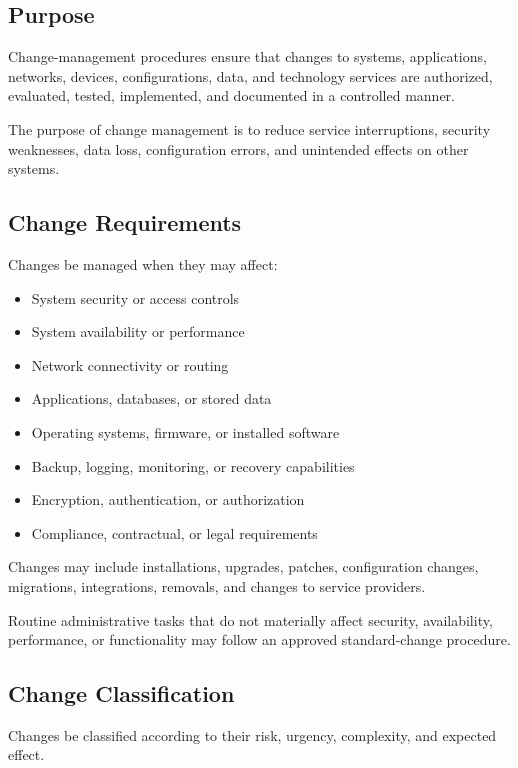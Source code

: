\subsection{Purpose}

Change-management procedures ensure that changes to systems, applications, networks, devices, configurations, data, and technology services are authorized, evaluated, tested, implemented, and documented in a controlled manner.

The purpose of change management is to reduce service interruptions, security weaknesses, data loss, configuration errors, and unintended effects on other systems.

\subsection{Change Requirements}

Changes \must{} be managed when they may affect:
\begin{itemize}
    \item System security or access controls
    \item System availability or performance
    \item Network connectivity or routing
    \item Applications, databases, or stored data
    \item Operating systems, firmware, or installed software
    \item Backup, logging, monitoring, or recovery capabilities
    \item Encryption, authentication, or authorization
    \item Compliance, contractual, or legal requirements
\end{itemize}

Changes may include installations, upgrades, patches, configuration changes, migrations, integrations, removals, and changes to service providers.

Routine administrative tasks that do not materially affect security, availability, performance, or functionality may follow an approved standard-change procedure.

\subsection{Change Classification}

Changes \should{} be classified according to their risk, urgency, complexity, and expected effect.

